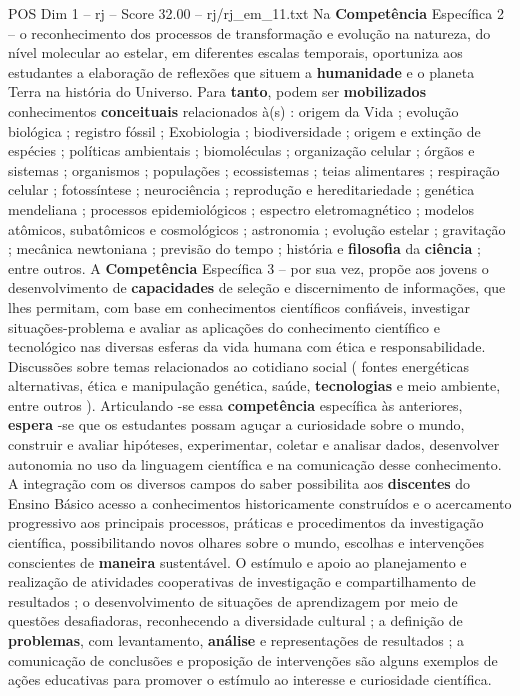 \begin{textsample}{POS Dim 1 – rj – Score 32.00 – rj/rj\_em\_11.txt}
Na \textbf{Competência} Específica 2 – o reconhecimento dos processos de transformação e evolução na natureza, do nível molecular ao estelar, em diferentes escalas temporais, oportuniza aos estudantes a elaboração de reflexões que situem a \textbf{humanidade} e o planeta Terra na história do Universo.
Para \textbf{tanto}, podem ser \textbf{mobilizados} conhecimentos \textbf{conceituais} relacionados à(s) : origem da Vida ; evolução biológica ; registro fóssil ; Exobiologia ; biodiversidade ; origem e extinção de espécies ; políticas ambientais ; biomoléculas ; organização celular ; órgãos e sistemas ; organismos ; populações ; ecossistemas ; teias alimentares ; respiração celular ; fotossíntese ; neurociência ; reprodução e hereditariedade ; genética mendeliana ; processos epidemiológicos ; espectro eletromagnético ; modelos atômicos, subatômicos e cosmológicos ; astronomia ; evolução estelar ; gravitação ; mecânica newtoniana ; previsão do tempo ; história e \textbf{filosofia} da \textbf{ciência} ; entre outros.
A \textbf{Competência} Específica 3 – por sua vez, propõe aos jovens o desenvolvimento de \textbf{capacidades} de seleção e discernimento de informações, que lhes permitam, com base em conhecimentos científicos confiáveis, investigar situações-problema e avaliar as aplicações do conhecimento científico e tecnológico nas diversas esferas da vida humana com ética e responsabilidade.
Discussões sobre temas relacionados ao cotidiano social ( fontes energéticas alternativas, ética e manipulação genética, saúde, \textbf{tecnologias} e meio ambiente, entre outros ).
Articulando -se essa \textbf{competência} específica às anteriores, \textbf{espera} -se que os estudantes possam aguçar a curiosidade sobre o mundo, construir e avaliar hipóteses, experimentar, coletar e analisar dados, desenvolver autonomia no uso da linguagem científica e na comunicação desse conhecimento.
A integração com os diversos campos do saber possibilita aos \textbf{discentes} do Ensino Básico acesso a conhecimentos historicamente construídos e o acercamento progressivo aos principais processos, práticas e procedimentos da investigação científica, possibilitando novos olhares sobre o mundo, escolhas e intervenções conscientes de \textbf{maneira} sustentável.
O estímulo e apoio ao planejamento e realização de atividades cooperativas de investigação e compartilhamento de resultados ; o desenvolvimento de situações de aprendizagem por meio de questões desafiadoras, reconhecendo a diversidade cultural ; a definição de \textbf{problemas}, com levantamento, \textbf{análise} e representações de resultados ; a comunicação de conclusões e proposição de intervenções são alguns exemplos de ações educativas para promover o estímulo ao interesse e curiosidade científica.

\end{textsample}

